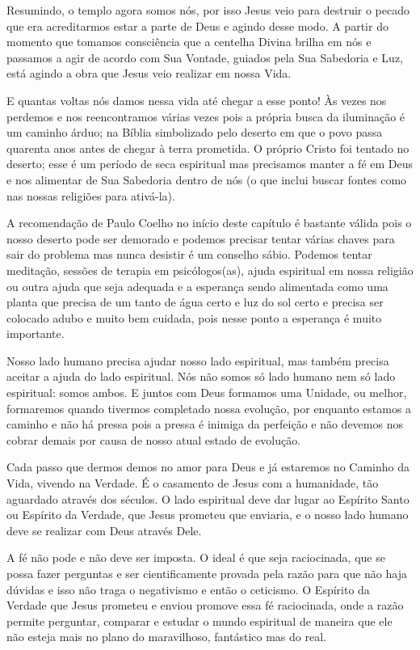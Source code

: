 \emdash{}Resumindo, o templo agora somos nós, por isso Jesus veio para destruir o pecado que era acreditarmos estar a parte de Deus e agindo desse modo. A partir do momento que tomamos consciência que a centelha Divina brilha em nós e passamos a agir de acordo com Sua Vontade, guiados pela Sua Sabedoria e Luz, está agindo a obra que Jesus veio realizar em nossa Vida. 

\emdash{}E quantas voltas nós damos nessa vida até chegar a esse ponto! Às vezes nos perdemos e nos reencontramos várias vezes pois a própria busca da iluminação é um caminho árduo; na Bíblia simbolizado pelo deserto em que o povo passa quarenta anos antes de chegar à terra prometida. O próprio Cristo foi tentado no deserto; esse é um período de seca espiritual mas precisamos manter a fé em Deus e nos alimentar de Sua Sabedoria dentro de nós (o que inclui buscar fontes como nas nossas religiões para ativá-la).

\emdash{}A recomendação de Paulo Coelho no início deste capítulo é bastante válida pois o nosso deserto pode ser demorado e podemos precisar tentar várias chaves para sair do problema mas nunca desistir é um conselho sábio. Podemos tentar meditação, sessões de terapia em psicólogos(as), ajuda espiritual em nossa religião ou outra ajuda que seja adequada e a esperança sendo alimentada como uma planta que precisa de um tanto de água certo e luz do sol certo e precisa ser colocado adubo e muito bem cuidada, pois nesse ponto a esperança é muito importante.

\emdash{}Nosso lado humano precisa ajudar nosso lado espiritual, mas também precisa aceitar a ajuda do lado espiritual. Nós não somos só lado humano nem só lado espiritual: somos ambos. E juntos com Deus formamos uma Unidade, ou melhor, formaremos quando tivermos completado nossa evolução, por enquanto estamos a caminho e não há pressa pois a pressa é inimiga da perfeição e não devemos nos cobrar demais por causa de nosso atual estado de evolução.

\emdash{}Cada passo que dermos demos no amor para Deus e já estaremos no Caminho da Vida, vivendo na Verdade. É o casamento de Jesus com a humanidade, tão aguardado através dos séculos. O lado espiritual deve dar lugar ao Espírito Santo ou Espírito da Verdade, que Jesus prometeu que enviaria, e o nosso lado humano deve se realizar com Deus através Dele.

\emdash{}A fé não pode e não deve ser imposta. O ideal é que seja raciocinada, que se possa fazer perguntas e ser cientificamente provada pela razão para que não haja dúvidas e isso não traga o negativismo e então o ceticismo. O Espírito da Verdade que Jesus prometeu e enviou promove essa fé raciocinada, onde a razão permite perguntar, comparar e estudar o mundo espiritual de maneira que ele não esteja mais no plano do maravilhoso, fantástico mas do real.

